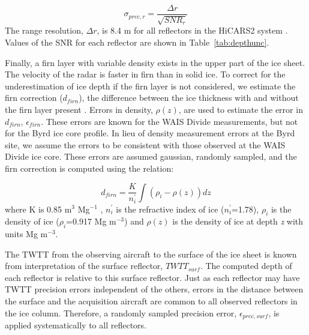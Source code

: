 \begin{equation}
\sigma_{prec,r} = \frac{\Delta{r}}{\sqrt{SNR_r}}
\end{equation} 
The range resolution, $\Delta{r}$, is 8.4 m for all reflectors in the HiCARS2 system \citep{young2011}. Values of the SNR for each reflector are shown in Table~\ref{tab:depthunc}. 


Finally, a firn layer with variable density \citep{gow1970} exists in the upper part of the ice sheet. The velocity of the radar is faster in firn than in solid ice. To correct for the underestimation of ice depth if the firn layer is not considered, we estimate the firn correction ($d_{firn}$), the difference between the ice thickness with and without the firn layer present . %
Errors in density, $\rho(z)$, are used to estimate the error in $d_{firn}$, $\epsilon_{firn}$. These errors are known for the WAIS Divide measurements, but not for the Byrd ice core profile. In lieu of density measurement errors at the Byrd site, we assume the errors to be consistent with those observed at the WAIS Divide ice core. These errors are assumed gaussian, randomly sampled, and the firn correction is computed using the \citet{dowdeswell2004} relation:

\begin{equation}
d_{firn} = \frac{K}{n^{'}_{i}}\int{(\rho_{i} - \rho(z)) dz}
\end{equation}
where K is 0.85 m$^{3}$ Mg$^{-1}$ \citep{robin1969}, $n^{'}_{i}$ is the refractive index of ice ($n^{'}_{i}$=1.78), $\rho_{i}$ is the density of ice ($\rho_{i}$=0.917 Mg m$^{-3}$) and $\rho(z)$ is the density of ice at depth \textit{z} with units Mg m$^{-3}$.

The TWTT from the observing aircraft to the surface of the ice sheet is known from interpretation of the surface reflector, $TWTT_{surf}$. The computed depth of each reflector is relative to this surface reflector. Just as each reflector may have TWTT precision errors independent of the others, errors in the distance between the surface and the acquisition aircraft are common to all observed reflectors in the ice column. Therefore, a randomly sampled precision error, $\epsilon_{prec,surf}$, is applied systematically to all reflectors.







